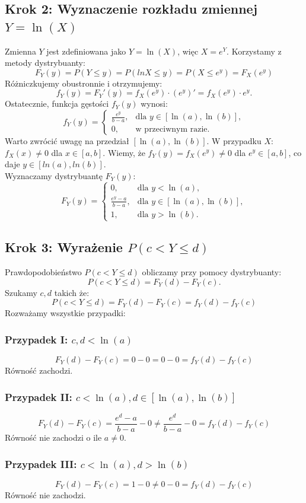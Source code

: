 \documentclass[polish, 8pt]{article}
\begin{document}
\subsection*{Krok 2: Wyznaczenie rozkładu zmiennej \( Y = \ln(X) \)}
Zmienna \( Y \) jest zdefiniowana jako \( Y = \ln(X) \), więc \( X = e^Y \). Korzystamy z metody dystrybuanty:
\[
F_Y(y) = P(Y \leq y) = P(lnX \leq y) = P(X \leq e^y) = F_X(e^y)
\]
Różniczkujemy obustronnie i otrzymujemy:
\[
f_Y(y) = F_Y'(y) = f_X(e^y) \cdot (e^y)' = f_X(e^y) \cdot e^y.
\]
Ostatecznie, funkcja gęstości \( f_Y(y) \) wynosi:
\[
f_Y(y) =
\begin{cases}
\frac{e^y}{b-a}, & \text{dla } y \in [\ln(a), \ln(b)], \\
0, & \text{w przeciwnym razie}.
\end{cases}
\]
Warto zwrócić uwagę na przedział $[\ln(a), \ln(b)]$. W przypadku $X$: $f_X(x) \neq 0$ dla $x \in [a, b]$. Wiemy, że $f_Y(y) = f_X(e^y) \neq 0$ dla $e^y \in [a, b]$, co daje $y \in [ln(a), ln(b)]$.\\
Wyznaczamy dystrybuantę \( F_Y(y) \):
\[
F_Y(y) =
\begin{cases}
0, & \text{dla } y < \ln(a), \\
\frac{e^y - a}{b-a}, & \text{dla } y \in [\ln(a), \ln(b)], \\
1, & \text{dla } y > \ln(b).
\end{cases}
\]
\subsection*{Krok 3: Wyrażenie \( P(c < Y \leq d) \)}
Prawdopodobieństwo \( P(c < Y \leq d) \) obliczamy przy pomocy dystrybuanty:
\[
P(c < Y \leq d) = F_Y(d) - F_Y(c).
\]
Szukamy $c, d$ takich że:
\[
P(c < Y \leq d) = F_Y(d) - F_Y(c) = f_Y(d) - f_Y(c)
\]
Rozważamy wszystkie przypadki:
\subsubsection*{Przypadek I: \( c,d < \ln(a) \)}
\[
 F_Y(d) - F_Y(c) = 0 - 0 = 0 - 0 = f_Y(d) - f_Y(c)
\]
Równość zachodzi.

\subsubsection*{Przypadek II: \( c < \ln(a), d \in [\ln(a), \ln(b)] \)}
\[
 F_Y(d) - F_Y(c) = \frac{e^d - a}{b-a} - 0 \neq \frac{e^d}{b-a} - 0 = f_Y(d) - f_Y(c)
\]
Równość nie zachodzi o ile $a \neq 0$.

\subsubsection*{Przypadek III: \( c < \ln(a), d > \ln(b) \)}
\[
 F_Y(d) - F_Y(c) = 1 - 0 \neq 0 - 0 = f_Y(d) - f_Y(c)
\]
Równość nie zachodzi.
\end{document}
